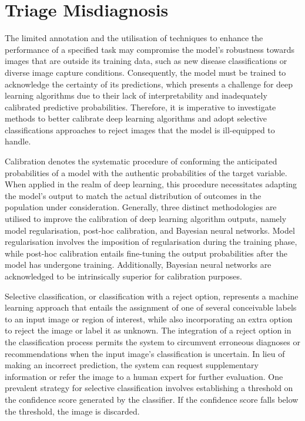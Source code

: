 \section{Triage Misdiagnosis}
The limited annotation and the utilisation of techniques to enhance the performance of a specified task may compromise the model's robustness towards images that are outside its training data, such as new disease classifications or diverse image capture conditions. Consequently, the model must be trained to acknowledge the certainty of its predictions, which presents a challenge for deep learning algorithms due to their lack of interpretability and inadequately calibrated predictive probabilities. Therefore, it is imperative to investigate methods to better calibrate deep learning algorithms and adopt selective classifications approaches to reject images that the model is ill-equipped to handle.

Calibration denotes the systematic procedure of conforming the anticipated probabilities of a model with the authentic probabilities of the target variable. When applied in the realm of deep learning, this procedure necessitates adapting the model's output to match the actual distribution of outcomes in the population under consideration. Generally, three distinct methodologies are utilised to improve the calibration of deep learning algorithm outputs, namely model regularisation, post-hoc calibration, and Bayesian neural networks. Model regularisation involves the imposition of regularisation during the training phase, while post-hoc calibration entails fine-tuning the output probabilities after the model has undergone training. Additionally, Bayesian neural networks are acknowledged to be intrinsically superior for calibration purposes.

Selective classification, or classification with a reject option, represents a machine learning approach that entails the assignment of one of several conceivable labels to an input image or region of interest, while also incorporating an extra option to reject the image or label it as unknown. The integration of a reject option in the classification process permits the system to circumvent erroneous diagnoses or recommendations when the input image's classification is uncertain. In lieu of making an incorrect prediction, the system can request supplementary information or refer the image to a human expert for further evaluation. One prevalent strategy for selective classification involves establishing a threshold on the confidence score generated by the classifier. If the confidence score falls below the threshold, the image is discarded.

